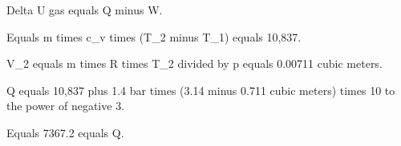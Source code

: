 Delta U gas equals Q minus W.  

Equals m times c_v times (T_2 minus T_1) equals 10,837.  

V_2 equals m times R times T_2 divided by p equals 0.00711 cubic meters.  

Q equals 10,837 plus 1.4 bar times (3.14 minus 0.711 cubic meters) times 10 to the power of negative 3.  

Equals 7367.2 equals Q.